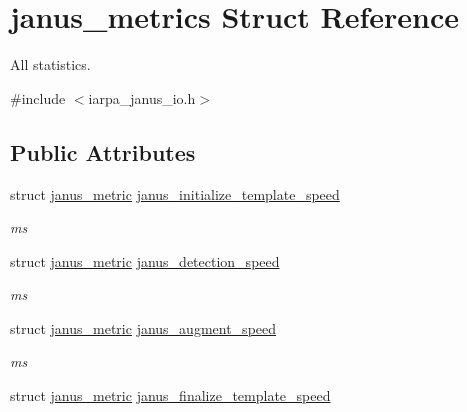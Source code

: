 \hypertarget{structjanus__metrics}{}\section{janus\+\_\+metrics Struct Reference}
\label{structjanus__metrics}


All statistics.  




{\ttfamily \#include $<$iarpa\+\_\+janus\+\_\+io.\+h$>$}

\subsection*{Public Attributes}
\begin{DoxyCompactItemize}
\item 
\hypertarget{structjanus__metrics_a08ec3fa0190b065ddb72df5dd747968c}{}struct \hyperlink{structjanus__metric}{janus\+\_\+metric} \hyperlink{structjanus__metrics_a08ec3fa0190b065ddb72df5dd747968c}{janus\+\_\+initialize\+\_\+template\+\_\+speed}\label{structjanus__metrics_a08ec3fa0190b065ddb72df5dd747968c}

\begin{DoxyCompactList}\small\item\em ms \end{DoxyCompactList}\item 
\hypertarget{structjanus__metrics_a756842721dc4dccafefe013bfc70c323}{}struct \hyperlink{structjanus__metric}{janus\+\_\+metric} \hyperlink{structjanus__metrics_a756842721dc4dccafefe013bfc70c323}{janus\+\_\+detection\+\_\+speed}\label{structjanus__metrics_a756842721dc4dccafefe013bfc70c323}

\begin{DoxyCompactList}\small\item\em ms \end{DoxyCompactList}\item 
\hypertarget{structjanus__metrics_a57f8771e3054926b7bf170e4e26c70c5}{}struct \hyperlink{structjanus__metric}{janus\+\_\+metric} \hyperlink{structjanus__metrics_a57f8771e3054926b7bf170e4e26c70c5}{janus\+\_\+augment\+\_\+speed}\label{structjanus__metrics_a57f8771e3054926b7bf170e4e26c70c5}

\begin{DoxyCompactList}\small\item\em ms \end{DoxyCompactList}\item 
\hypertarget{structjanus__metrics_ab02be1817f15b4d650f88d0073cbf9ca}{}struct \hyperlink{structjanus__metric}{janus\+\_\+metric} \hyperlink{structjanus__metrics_ab02be1817f15b4d650f88d0073cbf9ca}{janus\+\_\+finalize\+\_\+template\+\_\+speed}\label{structjanus__metrics_ab02be1817f15b4d650f88d0073cbf9ca}


\end{DoxyCompactItemize}
